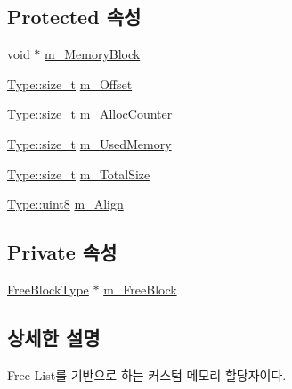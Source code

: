 \subsection*{Protected 속성}
\begin{DoxyCompactItemize}
\item 
void $\ast$ \hyperlink{class_comet_engine_1_1_core_1_1_memory_1_1_base_allocator_a24b4bdf45e7f4b6109b6d1cc455c6f26}{m\+\_\+\+Memory\+Block}
\item 
\hyperlink{namespace_comet_engine_1_1_type_a7c94ea6f8948649f8d181ae55911eeaf}{Type\+::size\+\_\+t} \hyperlink{class_comet_engine_1_1_core_1_1_memory_1_1_base_allocator_a71e2142fb28745ce9bc64de3a0ea1956}{m\+\_\+\+Offset}
\item 
\hyperlink{namespace_comet_engine_1_1_type_a7c94ea6f8948649f8d181ae55911eeaf}{Type\+::size\+\_\+t} \hyperlink{class_comet_engine_1_1_core_1_1_memory_1_1_base_allocator_abed7f06b465ee178701fe2cfc1aff9a6}{m\+\_\+\+Alloc\+Counter}
\item 
\hyperlink{namespace_comet_engine_1_1_type_a7c94ea6f8948649f8d181ae55911eeaf}{Type\+::size\+\_\+t} \hyperlink{class_comet_engine_1_1_core_1_1_memory_1_1_base_allocator_a1420047b91508f9ab33c448e8371511c}{m\+\_\+\+Used\+Memory}
\item 
\hyperlink{namespace_comet_engine_1_1_type_a7c94ea6f8948649f8d181ae55911eeaf}{Type\+::size\+\_\+t} \hyperlink{class_comet_engine_1_1_core_1_1_memory_1_1_base_allocator_abba9914681f05b98a55770daaf7d94be}{m\+\_\+\+Total\+Size}
\item 
\hyperlink{namespace_comet_engine_1_1_type_a1b09856a6463f2bcc4bd8ff0e4e3ee0f}{Type\+::uint8} \hyperlink{class_comet_engine_1_1_core_1_1_memory_1_1_base_allocator_a01f973630e3c1ac98b9defda193793b8}{m\+\_\+\+Align}
\end{DoxyCompactItemize}
\subsection*{Private 속성}
\begin{DoxyCompactItemize}
\item 
\hyperlink{struct_comet_engine_1_1_core_1_1_memory_1_1_free_list_allocator_1_1_free_block_type}{Free\+Block\+Type} $\ast$ \hyperlink{class_comet_engine_1_1_core_1_1_memory_1_1_free_list_allocator_a9e6f8b10d6e94738d154d9f7c72d2538}{m\+\_\+\+Free\+Block}
\end{DoxyCompactItemize}


\subsection{상세한 설명}
Free-\/\+List를 기반으로 하는 커스텀 메모리 할당자이다. 

